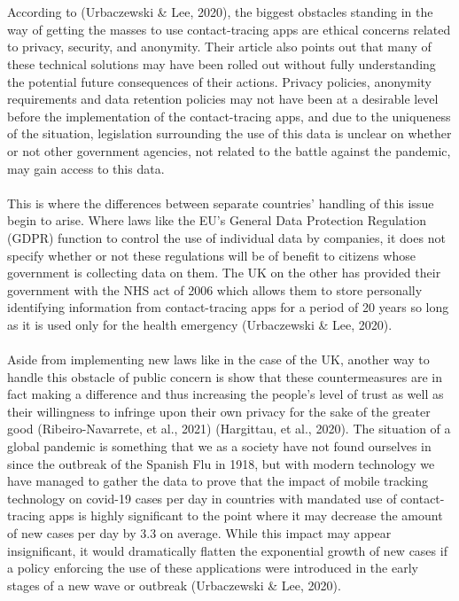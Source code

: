 \documentclass[11pt]{article}
\begin{document}
\\ \\
According to (Urbaczewski \& Lee, 2020), the biggest obstacles standing in the way of getting the masses to use contact-tracing apps are ethical concerns related to privacy, security, and anonymity. Their article also points out that many of these technical solutions may have been rolled out without fully understanding the potential future consequences of their actions. Privacy policies, anonymity requirements and data retention policies may not have been at a desirable level before the implementation of the contact-tracing apps, and due to the uniqueness of the situation, legislation surrounding the use of this data is unclear on whether or not other government agencies, not related to the battle against the pandemic, may gain access to this data. 
\\ \\
This is where the differences between separate countries’ handling of this issue begin to arise. Where laws like the EU’s General Data Protection Regulation (GDPR) function to control the use of individual data by companies, it does not specify whether or not these regulations will be of benefit to citizens whose government is collecting data on them. The UK on the other has provided their government with the NHS act of 2006 which allows them to store personally identifying information from contact-tracing apps for a period of 20 years so long as it is used only for the health emergency (Urbaczewski \& Lee, 2020).
\\ \\
Aside from implementing new laws like in the case of the UK, another way to handle this obstacle of public concern is show that these countermeasures are in fact making a difference and thus increasing the people’s level of trust as well as their willingness to infringe upon their own privacy for the sake of the greater good (Ribeiro-Navarrete, et al., 2021) (Hargittau, et al., 2020). The situation of a global pandemic is something that we as a society have not found ourselves in since the outbreak of the Spanish Flu in 1918, but with modern technology we have managed to gather the data to prove that the impact of mobile tracking technology on covid-19 cases per day in countries with mandated use of contact-tracing apps is highly significant to the point where it may decrease the amount of new cases per day by 3.3 on average. While this impact may appear insignificant, it would dramatically flatten the exponential growth of new cases if a policy enforcing the use of these applications were introduced in the early stages of a new wave or outbreak (Urbaczewski \& Lee, 2020).
\end{document}

